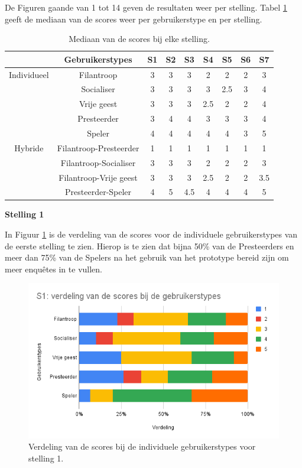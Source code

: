 De Figuren gaande van 1 tot 14 geven de resultaten weer per stelling. Tabel \ref{tab:mediaan} geeft de mediaan van de scores weer per gebruikerstype en per stelling.

\begin{table}
    \begin{center}
    \begin{tabular}{c|c|c|c|c|c|c|c|c}
        & Gebruikerstypes & S1 & S2 & S3  & S4  & S5  & S6 & S7  \\
        \hline
        Individueel & Filantroop             & 3  & 3  & 3   & 2   & 2   & 2  & 3   \\
        & Socialiser             & 3  & 3  & 3   & 3   & 2.5 & 3  & 4   \\
        & Vrije geest            & 3  & 3  & 3   & 2.5 & 2   & 2  & 4   \\
        & Presteerder            & 3  & 4  & 4   & 3   & 3   & 3  & 4   \\
        & Speler                 & 4  & 4  & 4   & 4   & 4   & 3  & 5   \\
        \hline
        Hybride     & Filantroop-Presteerder & 1  & 1  & 1   & 1   & 1   & 1  & 1   \\
        & Filantroop-Socialiser  & 3  & 3  & 3   & 2   & 2   & 2  & 3   \\
        & Filantroop-Vrije geest & 3  & 3  & 3   & 2.5 & 2   & 2  & 3.5 \\
        & Presteerder-Speler     & 4  & 5  & 4.5 & 4   & 4   & 4  & 5  
    \end{tabular}
    \end{center}
\caption{Mediaan van de scores bij elke stelling.}
\label{tab:mediaan}
\end{table}

\textbf{Stelling 1}

In Figuur \ref{fig:s1} is de verdeling van de scores voor de individuele gebruikerstypes van de eerste stelling te zien. Hierop is te zien dat bijna 50\% van de Presteerders en meer dan 75\% van de Spelers na het gebruik van het prototype bereid zijn om meer enquêtes in te vullen.

\begin{figure}
    \includegraphics[width=\linewidth]{S1.png}
    \caption{Verdeling van de scores bij de individuele gebruikerstypes voor stelling 1.}
    \label{fig:s1}
\end{figure}

